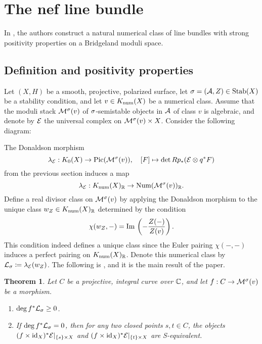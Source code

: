 \documentclass[letterpaper,12pt]{amsart}
\newtheorem{thm}{Theorem}[section]
\theoremstyle{remark}
\begin{document}

\section{The nef line bundle}
In \cite{BM}, the authors construct a natural numerical class of line bundles with strong positivity properties on a Bridgeland moduli space. 

\subsection{Definition and positivity properties}\label{positiveLBdefandprops}
Let $(X,H)$ be a smooth, projective, polarized surface, let $\sigma = (\mathcal{A}, Z) \in \operatorname{\mathrm{Stab}}(X)$ be a stability condition, and let $v \in K_{\mathrm{num}}(X)$ be a numerical class. Assume that the moduli stack $\mathcal{M}^\sigma(v)$ of $\sigma$-semistable objects in $\mathcal{A}$ of class $v$ is algebraic, and denote by $\mathcal{E}$ the universal complex on $\mathcal{M}^\sigma(v) \times X$. Consider the following diagram:
\begin{center}
\end{center}
The Donaldson morphism
\[ \lambda_{\mathcal{E}}: K_0(X) \to \mathrm{Pic}(\mathcal{M}^\sigma(v)), \quad [F] \mapsto \det R p_*(\mathcal{E} \otimes q^* F) \]
from the previous section induces a map 
\[ \lambda_{\mathcal{E}}: K_{\mathrm{num}}(X)_{\mathbb{R}} \to \mathrm{Num}(\mathcal{M}^\sigma(v))_{\mathbb{R}}. \]
Define a real divisor class on $\mathcal{M}^\sigma(v)$ by applying the Donaldson morphism to the unique class $w_Z \in K_{\mathrm{num}}(X)_{\mathbb{R}}$ determined by the condition
\[ \chi(w_Z, -) = \mathrm{Im}\,\left(-\frac{Z(-)}{Z(v)}\right). \]
This condition indeed defines a unique class since the Euler pairing $\chi(-,-)$ induces a perfect pairing on $K_{\mathrm{num}}(X)_{\mathbb{R}}$. Denote this numerical class by $\mathcal{L}_\sigma \coloneqq \lambda_{\mathcal{E}}(w_Z)$. The following is \cite[Lemma 3.3]{BM}, and it is the main result of the paper.
\begin{thm}\label{BMpositivity}
    Let $C$ be a projective, integral curve over $\mathbb{C}$, and let $f: C \to \mathcal{M}^\sigma(v)$ be a morphism.
    \begin{enumerate}[(1)]
        \item $\deg f^* \mathcal{L}_\sigma \ge 0$.
        \item If $\deg f^* \mathcal{L}_\sigma = 0$, then for any two closed points $s, t \in C$, the objects \\ $(f \times \mathrm{id}_X)^*\mathcal{E}|_{\{s\} \times X}$ and $(f\times \mathrm{id}_X)^*\mathcal{E}|_{\{t\} \times X}$ are S-equivalent.
    \end{enumerate}
\end{thm}
\end{document}
